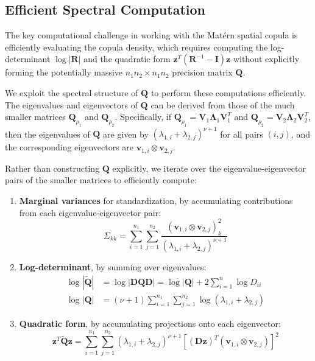 \subsection{Efficient Spectral Computation}
The key computational challenge in working with the Matérn spatial copula is efficiently evaluating the copula density, which requires computing the log-determinant $\log|\mathbf{R}|$ and the quadratic form $\mathbf{z}^T(\mathbf{R}^{-1} - \mathbf{I})\mathbf{z}$ without explicitly forming the potentially massive $n_1 n_2 \times n_1 n_2$ precision matrix $\mathbf{Q}$.

We exploit the spectral structure of $\mathbf{Q}$ to perform these computations efficiently. The eigenvalues and eigenvectors of $\mathbf{Q}$ can be derived from those of the much smaller matrices $\mathbf{Q}_{\rho_1}$ and $\mathbf{Q}_{\rho_2}$. Specifically, if $\mathbf{Q}_{\rho_1} = \mathbf{V}_1 \mathbf{\Lambda}_1 \mathbf{V}_1^T$ and $\mathbf{Q}_{\rho_2} = \mathbf{V}_2 \mathbf{\Lambda}_2 \mathbf{V}_2^T$, then the eigenvalues of $\mathbf{Q}$ are given by $(\lambda_{1,i} + \lambda_{2,j})^{\nu+1}$ for all pairs $(i,j)$, and the corresponding eigenvectors are $\mathbf{v}_{1,i} \otimes \mathbf{v}_{2,j}$.

Rather than constructing $\mathbf{Q}$ explicitly, we iterate over the eigenvalue-eigenvector pairs of the smaller matrices to efficiently compute:

\begin{enumerate}
\item \textbf{Marginal variances} for standardization, by accumulating contributions from each eigenvalue-eigenvector pair:
   \begin{equation}
   \Sigma_{kk} = \sum_{i=1}^{n_1}\sum_{j=1}^{n_2} \frac{(\mathbf{v}_{1,i} \otimes \mathbf{v}_{2,j})_k^2}{(\lambda_{1,i} + \lambda_{2,j})^{\nu+1}}
   \end{equation}

\item \textbf{Log-determinant}, by summing over eigenvalues:
   \begin{align}
   \log|\tilde{\mathbf{Q}}| &= \log|\mathbf{D}\mathbf{Q}\mathbf{D}| = \log|\mathbf{Q}| + 2\sum_{i=1}^n \log D_{ii} \\
   \log|\mathbf{Q}| &= (\nu+1)\sum_{i=1}^{n_1}\sum_{j=1}^{n_2} \log(\lambda_{1,i} + \lambda_{2,j})
   \end{align}

\item \textbf{Quadratic form}, by accumulating projections onto each eigenvector:
   \begin{equation}
   \mathbf{z}^T\tilde{\mathbf{Q}}\mathbf{z} = \sum_{i=1}^{n_1}\sum_{j=1}^{n_2} (\lambda_{1,i} + \lambda_{2,j})^{\nu+1} [(\mathbf{D}\mathbf{z})^T(\mathbf{v}_{1,i} \otimes \mathbf{v}_{2,j})]^2
   \end{equation}
\end{enumerate}

